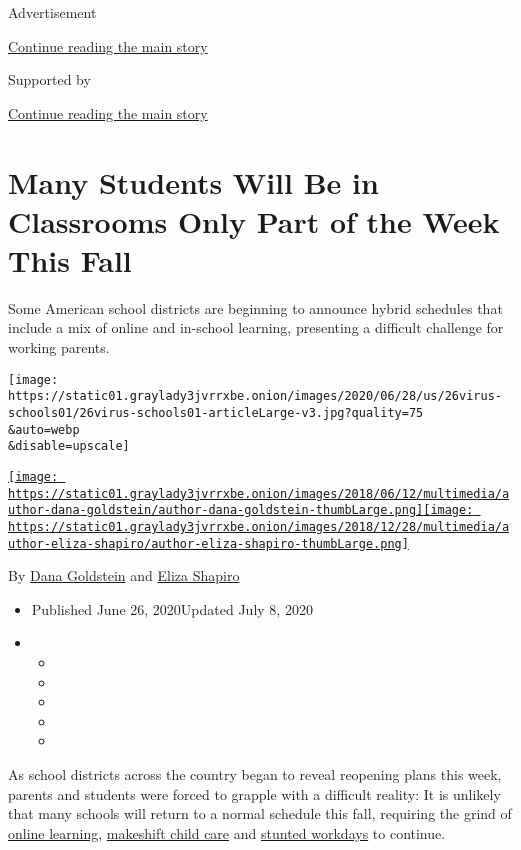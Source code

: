 Advertisement

\protect\hyperlink{after-top}{Continue reading the main story}

Supported by

\protect\hyperlink{after-sponsor}{Continue reading the main story}

\hypertarget{many-students-will-be-in-classrooms-only-part-of-the-week-this-fall}{%
\section{Many Students Will Be in Classrooms Only Part of the Week This
Fall}\label{many-students-will-be-in-classrooms-only-part-of-the-week-this-fall}}

Some American school districts are beginning to announce hybrid
schedules that include a mix of online and in-school learning,
presenting a difficult challenge for working parents.

\texttt{[image: https://static01.graylady3jvrrxbe.onion/images/2020/06/28/us/26virus-schools01/26virus-schools01-articleLarge-v3.jpg?quality=75\\\&auto=webp\\\&disable=upscale]}

\href{https://www.nytimes3xbfgragh.onion/by/dana-goldstein}{\texttt{[image: https://static01.graylady3jvrrxbe.onion/images/2018/06/12/multimedia/author-dana-goldstein/author-dana-goldstein-thumbLarge.png]}}\href{https://www.nytimes3xbfgragh.onion/by/eliza-shapiro}{\texttt{[image: https://static01.graylady3jvrrxbe.onion/images/2018/12/28/multimedia/author-eliza-shapiro/author-eliza-shapiro-thumbLarge.png]}}

By \href{https://www.nytimes3xbfgragh.onion/by/dana-goldstein}{Dana
Goldstein} and
\href{https://www.nytimes3xbfgragh.onion/by/eliza-shapiro}{Eliza
Shapiro}

\begin{itemize}
\item
  Published June 26, 2020Updated July 8, 2020
\item
  \begin{itemize}
  \item
  \item
  \item
  \item
  \item
  \end{itemize}
\end{itemize}

As school districts across the country began to reveal reopening plans
this week, parents and students were forced to grapple with a difficult
reality: It is unlikely that many schools will return to a normal
schedule this fall, requiring the grind of
\href{https://www.nytimes3xbfgragh.onion/2020/06/05/us/coronavirus-education-lost-learning.html}{online
learning},
\href{https://www.nytimes3xbfgragh.onion/2020/05/29/us/coronavirus-child-care-centers.html}{makeshift
child care} and
\href{https://www.nytimes3xbfgragh.onion/2020/06/03/business/economy/coronavirus-working-women.html}{stunted
workdays} to continue.

